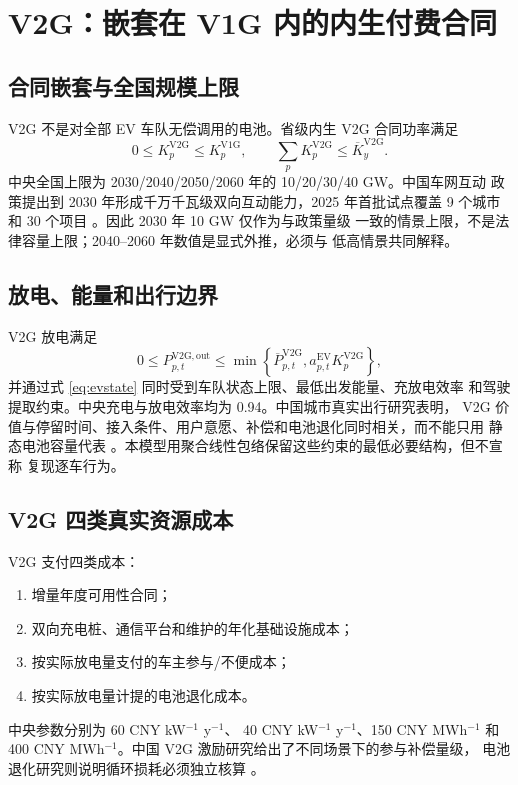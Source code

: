 \documentclass[UTF8,fontset=fandol,12pt]{ctexart}
\begin{document}
\section{V2G：嵌套在 V1G 内的内生付费合同}

\subsection{合同嵌套与全国规模上限}

V2G 不是对全部 EV 车队无偿调用的电池。省级内生 V2G 合同功率满足
\begin{equation}
  0\le K^{\mathrm{V2G}}_p
  \le K^{\mathrm{V1G}}_p,
  \qquad
  \sum_p K^{\mathrm{V2G}}_p
  \le \overline K^{\mathrm{V2G}}_y.
  \label{eq:v2gcontract}
\end{equation}
中央全国上限为 2030/2040/2050/2060 年的 10/20/30/40 GW。中国车网互动
政策提出到 2030 年形成千万千瓦级双向互动能力，2025 年首批试点覆盖
9 个城市和 30 个项目
\cite{NDRCVGI2023,NDRCVGIPilot2025}。因此 2030 年 10 GW 仅作为与政策量级
一致的情景上限，不是法律容量上限；2040--2060 年数值是显式外推，必须与
低高情景共同解释。

\subsection{放电、能量和出行边界}

V2G 放电满足
\begin{equation}
  0\le P^{\mathrm{V2G,out}}_{p,t}
  \le
  \min\left\{
    \overline P^{\mathrm{V2G}}_{p,t},
    a^{\mathrm{EV}}_{p,t}K^{\mathrm{V2G}}_p
  \right\},
\end{equation}
并通过式 \eqref{eq:evstate} 同时受到车队状态上限、最低出发能量、充放电效率
和驾驶提取约束。中央充电与放电效率均为 0.94。中国城市真实出行研究表明，
V2G 价值与停留时间、接入条件、用户意愿、补偿和电池退化同时相关，而不能只用
静态电池容量代表
\cite{Li2025V2G}。本模型用聚合线性包络保留这些约束的最低必要结构，但不宣称
复现逐车行为。

\subsection{V2G 四类真实资源成本}

V2G 支付四类成本：
\begin{enumerate}
  \item 增量年度可用性合同；
  \item 双向充电桩、通信平台和维护的年化基础设施成本；
  \item 按实际放电量支付的车主参与/不便成本；
  \item 按实际放电量计提的电池退化成本。
\end{enumerate}
中央参数分别为 60 CNY kW$^{-1}$ y$^{-1}$、
40 CNY kW$^{-1}$ y$^{-1}$、150 CNY MWh$^{-1}$ 和
400 CNY MWh$^{-1}$。中国 V2G 激励研究给出了不同场景下的参与补偿量级，
电池退化研究则说明循环损耗必须独立核算
\cite{Wan2026V2G,Sagaria2025V2G,IEAV2G2026}。
\end{document}
